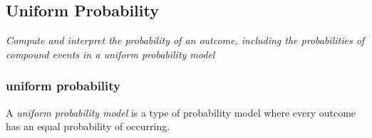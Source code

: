 \subsection[uniform probability]{Uniform Probability}

\textit{Compute and interpret the probability of an outcome, including the probabilities of compound events in a uniform probability model}


\subsubsection[short]{uniform probability}

A \textit{uniform probability model} is a type of probability model where every outcome has an equal probability of occurring.